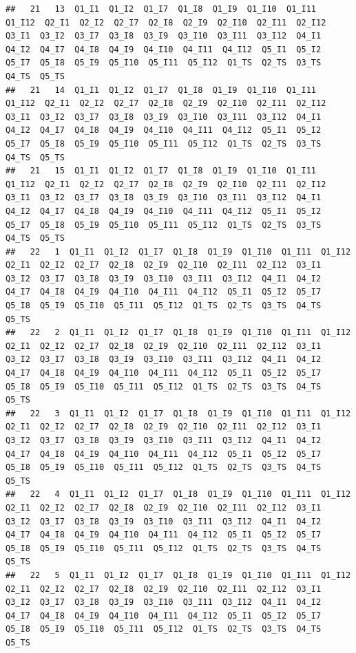 \documentclass[]{book}
\begin{document}
\begin{verbatim}
##   21   13  Q1_I1  Q1_I2  Q1_I7  Q1_I8  Q1_I9  Q1_I10  Q1_I11  Q1_I12  Q2_I1  Q2_I2  Q2_I7  Q2_I8  Q2_I9  Q2_I10  Q2_I11  Q2_I12  Q3_I1  Q3_I2  Q3_I7  Q3_I8  Q3_I9  Q3_I10  Q3_I11  Q3_I12  Q4_I1  Q4_I2  Q4_I7  Q4_I8  Q4_I9  Q4_I10  Q4_I11  Q4_I12  Q5_I1  Q5_I2  Q5_I7  Q5_I8  Q5_I9  Q5_I10  Q5_I11  Q5_I12  Q1_TS  Q2_TS  Q3_TS  Q4_TS  Q5_TS
##   21   14  Q1_I1  Q1_I2  Q1_I7  Q1_I8  Q1_I9  Q1_I10  Q1_I11  Q1_I12  Q2_I1  Q2_I2  Q2_I7  Q2_I8  Q2_I9  Q2_I10  Q2_I11  Q2_I12  Q3_I1  Q3_I2  Q3_I7  Q3_I8  Q3_I9  Q3_I10  Q3_I11  Q3_I12  Q4_I1  Q4_I2  Q4_I7  Q4_I8  Q4_I9  Q4_I10  Q4_I11  Q4_I12  Q5_I1  Q5_I2  Q5_I7  Q5_I8  Q5_I9  Q5_I10  Q5_I11  Q5_I12  Q1_TS  Q2_TS  Q3_TS  Q4_TS  Q5_TS
##   21   15  Q1_I1  Q1_I2  Q1_I7  Q1_I8  Q1_I9  Q1_I10  Q1_I11  Q1_I12  Q2_I1  Q2_I2  Q2_I7  Q2_I8  Q2_I9  Q2_I10  Q2_I11  Q2_I12  Q3_I1  Q3_I2  Q3_I7  Q3_I8  Q3_I9  Q3_I10  Q3_I11  Q3_I12  Q4_I1  Q4_I2  Q4_I7  Q4_I8  Q4_I9  Q4_I10  Q4_I11  Q4_I12  Q5_I1  Q5_I2  Q5_I7  Q5_I8  Q5_I9  Q5_I10  Q5_I11  Q5_I12  Q1_TS  Q2_TS  Q3_TS  Q4_TS  Q5_TS
##   22   1  Q1_I1  Q1_I2  Q1_I7  Q1_I8  Q1_I9  Q1_I10  Q1_I11  Q1_I12  Q2_I1  Q2_I2  Q2_I7  Q2_I8  Q2_I9  Q2_I10  Q2_I11  Q2_I12  Q3_I1  Q3_I2  Q3_I7  Q3_I8  Q3_I9  Q3_I10  Q3_I11  Q3_I12  Q4_I1  Q4_I2  Q4_I7  Q4_I8  Q4_I9  Q4_I10  Q4_I11  Q4_I12  Q5_I1  Q5_I2  Q5_I7  Q5_I8  Q5_I9  Q5_I10  Q5_I11  Q5_I12  Q1_TS  Q2_TS  Q3_TS  Q4_TS  Q5_TS
##   22   2  Q1_I1  Q1_I2  Q1_I7  Q1_I8  Q1_I9  Q1_I10  Q1_I11  Q1_I12  Q2_I1  Q2_I2  Q2_I7  Q2_I8  Q2_I9  Q2_I10  Q2_I11  Q2_I12  Q3_I1  Q3_I2  Q3_I7  Q3_I8  Q3_I9  Q3_I10  Q3_I11  Q3_I12  Q4_I1  Q4_I2  Q4_I7  Q4_I8  Q4_I9  Q4_I10  Q4_I11  Q4_I12  Q5_I1  Q5_I2  Q5_I7  Q5_I8  Q5_I9  Q5_I10  Q5_I11  Q5_I12  Q1_TS  Q2_TS  Q3_TS  Q4_TS  Q5_TS
##   22   3  Q1_I1  Q1_I2  Q1_I7  Q1_I8  Q1_I9  Q1_I10  Q1_I11  Q1_I12  Q2_I1  Q2_I2  Q2_I7  Q2_I8  Q2_I9  Q2_I10  Q2_I11  Q2_I12  Q3_I1  Q3_I2  Q3_I7  Q3_I8  Q3_I9  Q3_I10  Q3_I11  Q3_I12  Q4_I1  Q4_I2  Q4_I7  Q4_I8  Q4_I9  Q4_I10  Q4_I11  Q4_I12  Q5_I1  Q5_I2  Q5_I7  Q5_I8  Q5_I9  Q5_I10  Q5_I11  Q5_I12  Q1_TS  Q2_TS  Q3_TS  Q4_TS  Q5_TS
##   22   4  Q1_I1  Q1_I2  Q1_I7  Q1_I8  Q1_I9  Q1_I10  Q1_I11  Q1_I12  Q2_I1  Q2_I2  Q2_I7  Q2_I8  Q2_I9  Q2_I10  Q2_I11  Q2_I12  Q3_I1  Q3_I2  Q3_I7  Q3_I8  Q3_I9  Q3_I10  Q3_I11  Q3_I12  Q4_I1  Q4_I2  Q4_I7  Q4_I8  Q4_I9  Q4_I10  Q4_I11  Q4_I12  Q5_I1  Q5_I2  Q5_I7  Q5_I8  Q5_I9  Q5_I10  Q5_I11  Q5_I12  Q1_TS  Q2_TS  Q3_TS  Q4_TS  Q5_TS
##   22   5  Q1_I1  Q1_I2  Q1_I7  Q1_I8  Q1_I9  Q1_I10  Q1_I11  Q1_I12  Q2_I1  Q2_I2  Q2_I7  Q2_I8  Q2_I9  Q2_I10  Q2_I11  Q2_I12  Q3_I1  Q3_I2  Q3_I7  Q3_I8  Q3_I9  Q3_I10  Q3_I11  Q3_I12  Q4_I1  Q4_I2  Q4_I7  Q4_I8  Q4_I9  Q4_I10  Q4_I11  Q4_I12  Q5_I1  Q5_I2  Q5_I7  Q5_I8  Q5_I9  Q5_I10  Q5_I11  Q5_I12  Q1_TS  Q2_TS  Q3_TS  Q4_TS  Q5_TS

\end{verbatim}
\end{document}
